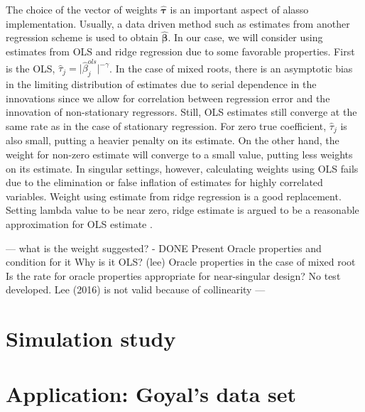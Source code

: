 \documentclass[12pt,a4paper]{article}
\begin{document}
The choice of the vector of weights $ \hat{\bm{\tau}} $ is an important aspect of alasso implementation. Usually, a data driven method such as estimates from another regression scheme is used to obtain $ \hat{\bm{\beta}}$. In our case, we will consider using estimates from OLS and ridge regression due to some favorable properties. First is the OLS, $ \hat{\tau}_j = \vert\hat{\beta}_j^{ols}\vert^{-\gamma} $. In the case of mixed roots, there is an asymptotic bias in the limiting distribution of estimates due to serial dependence in the innovations since we allow for correlation between regression error and the innovation of non-stationary regressors. Still, OLS estimates still converge at the same rate as in the case of stationary regression. For zero true coefficient, $ \hat{\tau}_j $ is also small, putting a heavier penalty on its estimate. On the other hand, the weight for non-zero estimate will converge to a small value, putting less weights on its estimate. In singular settings, however, calculating weights using OLS fails due to the elimination or false inflation of estimates for highly correlated variables. Weight using estimate from ridge regression is a good replacement. Setting lambda value to be near zero, ridge estimate is argued to be a reasonable approximation for OLS estimate \citep{knight2000asymptotics}. 



--- what is the weight suggested? - DONE 
Present Oracle properties and condition for it
Why is it OLS? (lee) 
Oracle properties in the case of mixed root
Is the rate for oracle properties appropriate for near-singular design?
No test developed. Lee (2016) is not valid because of collinearity 
---




\section{Simulation study}

\section{Application: Goyal's data set}



\end{document}

